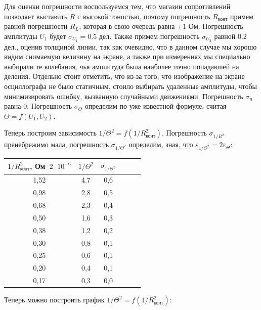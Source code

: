 \documentclass[14pt]{article}
\begin{document}
Для оценки погрешности воспользуемся тем, что магазин сопротивлений позволяет выставить $R$ с высокой тоностью, поэтому погрешность $R_{\text{конт}}$ примем равной погрешности $R_L$, которая в свою очередь равна $\pm 1$ Ом. Погрешность амплитуды $U_1$ будет $\sigma_{U_1} = 0.5$ дел. Также примем погрешность $\sigma_{U_2}$ равной 
$0.2$ дел., оценив толщиной линии, так как очевидно, что в данном случае мы хорошо видим снимаемую величину на экране, а также при измерениях мы специально выбирали те колебания, чья амплитуда была наиболее точно попадавшей на деления. Отдельно стоит отметить, что из-за того, что изображение на экране осциллографа не было статичным, стоило выбирать удаленные амплитуды, чтобы минимизировать ошибку, вызванную случайными движениями. Погрешность $\sigma_n$ равна 0. Погрешность $\sigma_{\Theta}$ определим по уже известной формуле, считая $\Theta = f(U_1, U_2)$.

Теперь построим зависимость $1/\Theta^2 = f(1/R_{\text{конт}}^2)$. Погрешность $\sigma_{1/R^2}$ пренебрежимо мала, погрешность $\sigma_{1/\Theta^2}$ определим, зная, что 
$\varepsilon_{1/\Theta^2} = 2\varepsilon_{\Theta}$:

\begin{center}
\begin{tabular}{|c|c|c|c|c|c|}
\hline
$1/R_{\text{конт}}^2$, Ом$^-2 \cdot 10^{-6}$&$1/\Theta^2$&$\sigma_{1/\Theta^2}$\\
\hline
1,52&4.7&0,6\\
\hline
0,98&2,8&0,5\\
\hline
0,68&2,3&0,4\\
\hline
0,50&1,6&0,3\\
\hline
0,38&1,2&0,2\\
\hline
0,30&0,8&0,1\\
\hline
0,25&0,6&0,1\\
\hline
0,20&0,4&0,1\\
\hline
0,17&0,3&0,0\\
\hline
\end{tabular}
\end{center}

\vspace{1cm}
Теперь можно построить график $1/\Theta^2 = f(1/R_{\text{конт}}^2)$:
\end{document}
